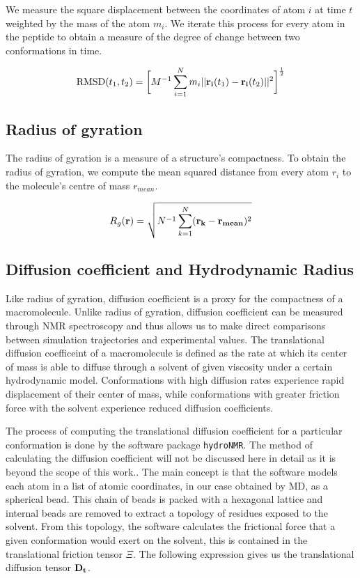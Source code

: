 We measure the square displacement between the coordinates of atom $i$ at time $t$ weighted by the mass of the atom $m_i$. We iterate this process for every atom in the peptide to obtain a measure of the degree of change between two conformations in time.

\begin{equation}
\text{RMSD}(t_1, t_2) = \bigg[ M^{-1} \sum_{i=1}^{N} m_{i} \lvert \lvert \mathbf{r_{i}}(t_{1}) - \mathbf{r_{i}}(t_{2}) \rvert \rvert^2 \bigg]^\frac{1}{2}
\end{equation}


\subsection{Radius of gyration}

The radius of gyration is a measure of a structure's compactness. To obtain the radius of gyration, we compute the mean squared distance from every atom $r_i$ to the molecule's centre of mass $r_{mean}$.

\begin{equation}
R_g(\mathbf{r}) = \sqrt{N^{-1} \sum_{k=1}^{N} (\mathbf{r_k} - \mathbf{r_{mean}})^2}
\end{equation}

\subsection{Diffusion coefficient and Hydrodynamic Radius}

Like radius of gyration, diffusion coefficient is a proxy for the compactness of a macromolecule. Unlike radius of gyration, diffusion coefficient can be measured through NMR spectroscopy and thus allows us to make direct comparisons between simulation trajectories and experimental values. The translational diffusion coefficeint of a macromolecule is defined as the rate at which its center of mass is able to diffuse through a solvent of given viscosity under a certain hydrodynamic model. Conformations with high diffusion rates experience rapid displacement of their center of mass, while conformations with greater friction force with the solvent experience reduced diffusion coefficients. 

The process of computing the translational diffusion coefficient for a particular conformation is done by the software package \texttt{hydroNMR}. The method of calculating the diffusion coefficient will not be discussed here in detail as it is beyond the scope of this work.. The main concept is that the software models each atom in a list of atomic coordinates, in our case obtained by MD, as a spherical bead. This chain of beads is packed with a hexagonal lattice and internal beads are removed to extract a topology of residues exposed to the solvent. From this topology, the software calculates the frictional force that a given conformation would exert on the solvent, this is contained in the translational friction tensor $\Xi$. The following expression gives us the translational diffusion tensor $\mathbf{D_t}$.

